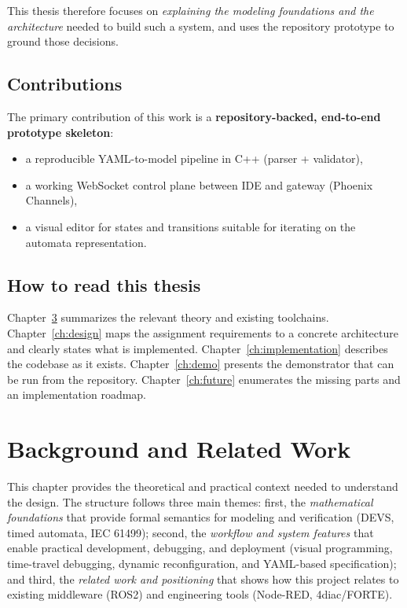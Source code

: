This thesis therefore focuses on \emph{explaining the modeling foundations and the architecture} needed to build such a system, and uses the repository prototype to ground those decisions.

\section{Contributions}

The primary contribution of this work is a \textbf{repository-backed, end-to-end prototype skeleton}:
\begin{itemize}
  \item a reproducible YAML-to-model pipeline in C++ (parser + validator),
  \item a working WebSocket control plane between IDE and gateway (Phoenix Channels),
  \item a visual editor for states and transitions suitable for iterating on the automata representation.
\end{itemize}

\section{How to read this thesis}

Chapter~\ref{ch:background} summarizes the relevant theory and existing toolchains.
Chapter~\ref{ch:design} maps the assignment requirements to a concrete architecture and clearly states what is implemented.
Chapter~\ref{ch:implementation} describes the codebase as it exists.
Chapter~\ref{ch:demo} presents the demonstrator that can be run from the repository.
Chapter~\ref{ch:future} enumerates the missing parts and an implementation roadmap.

\chapter{Background and Related Work}
\label{ch:background}

This chapter provides the theoretical and practical context needed to understand the design.
The structure follows three main themes: first, the \emph{mathematical foundations} that provide formal semantics for modeling and verification (DEVS, timed automata, IEC 61499); second, the \emph{workflow and system features} that enable practical development, debugging, and deployment (visual programming, time-travel debugging, dynamic reconfiguration, and YAML-based specification); and third, the \emph{related work and positioning} that shows how this project relates to existing middleware (ROS2) and engineering tools (Node-RED, 4diac/FORTE).


